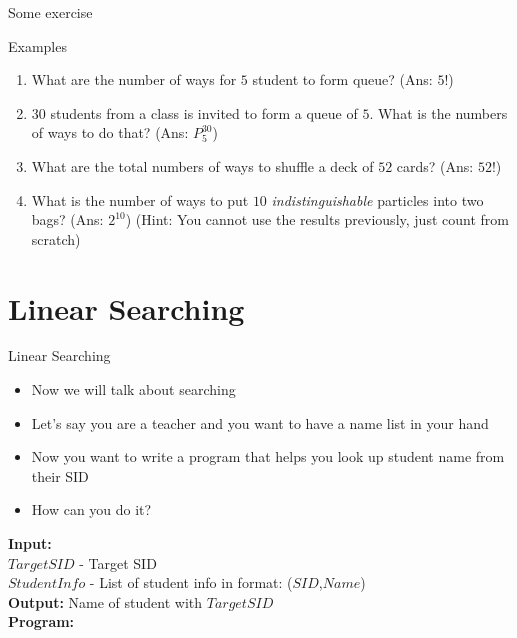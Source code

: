 \documentclass[10pt,xcolor={table,dvipsnames},t]{beamer}
\begin{document}
\begin{frame}{Some exercise}
  \begin{exampleblock}{Examples}
    \begin{enumerate}
      \item What are the number of ways for $5$ student to form queue? (Ans: $5!$)
      \item $30$ students from a class is invited to form a queue of $5$. What is the numbers of ways to do that? (Ans: $P^{30}_5$)
      \item What are the total numbers of ways to shuffle a deck of $52$ cards? (Ans: $52!$)
      \item What is the number of ways to put $10$ \textit{indistinguishable} particles into two bags? (Ans: $2^{10}$) (Hint: You cannot use the results previously, just count from scratch)
    \end{enumerate}
  \end{exampleblock}
\end{frame}

\section{Linear Searching}
\begin{frame}{Linear Searching}
  \begin{itemize}
    \item Now we will talk about searching
    \item Let's say you are a teacher and you want to have a name list in your hand 
    \item Now you want to write a program that helps you look up student name from their SID 
    \item How can you do it?
  \end{itemize}
\end{frame}

\begin{frame}
  \begin{algorithm}[H]
    \caption{Linear Search} \label{alg:linear_search}
    \begin{flushleft}
      \textbf{Input:}\\ 
      $TargetSID$ - Target SID \\
      $StudentInfo$ -  List of student info in format: ($SID$,$Name$)\\
      \textbf{Output:} Name of student with $TargetSID$\\
      \textbf{Program:} 
    \end{flushleft}
    \begin{algorithmic}
        \EndIf
      \EndFor
    \end{algorithmic}
  \end{algorithm}
\end{frame}
\end{document}
